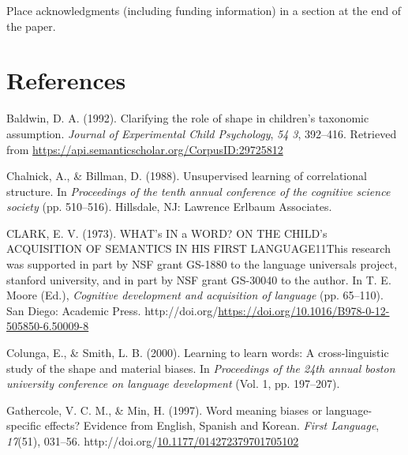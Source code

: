\documentclass[10pt, letterpaper]{article}
\newenvironment{CSLReferences}%
  {}%
  {\par}
\begin{document}
Place acknowledgments (including funding information) in a section at
the end of the paper.

\hypertarget{references}{%
\section{References}\label{references}}

\setlength{\parindent}{-0.1in} 
\setlength{\leftskip}{0.125in}

\noindent

\hypertarget{refs}{}
\begin{CSLReferences}{1}{0}
\leavevmode{}%
Baldwin, D. A. (1992). Clarifying the role of shape in children's
taxonomic assumption. \emph{Journal of Experimental Child Psychology},
\emph{54 3}, 392--416. Retrieved from
\url{https://api.semanticscholar.org/CorpusID:29725812}

\leavevmode{}%
Chalnick, A., \& Billman, D. (1988). Unsupervised learning of
correlational structure. In \emph{Proceedings of the tenth annual
conference of the cognitive science society} (pp. 510--516). Hillsdale,
NJ: Lawrence Erlbaum Associates.

\leavevmode{}%
CLARK, E. V. (1973). WHAT's IN a WORD? ON THE CHILD's ACQUISITION OF
SEMANTICS IN HIS FIRST LANGUAGE11This research was supported in part by
NSF grant GS-1880 to the language universals project, stanford
university, and in part by NSF grant GS-30040 to the author. In T. E.
Moore (Ed.), \emph{Cognitive development and acquisition of language}
(pp. 65--110). San Diego: Academic Press.
http://doi.org/\url{https://doi.org/10.1016/B978-0-12-505850-6.50009-8}

\leavevmode{}%
Colunga, E., \& Smith, L. B. (2000). Learning to learn words: A
cross-linguistic study of the shape and material biases. In
\emph{Proceedings of the 24th annual boston university conference on
language development} (Vol. 1, pp. 197--207).

\leavevmode{}%
Gathercole, V. C. M., \& Min, H. (1997). Word meaning biases or
language-specific effects? {Evidence} from {English}, {Spanish} and
{Korean}. \emph{First Language}, \emph{17}(51), 031--56.
http://doi.org/\href{https://doi.org/10.1177/014272379701705102}{10.1177/014272379701705102}


\end{CSLReferences}
\end{document}
